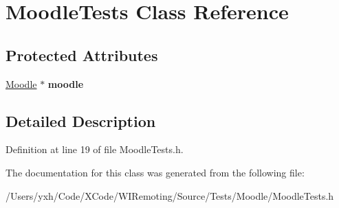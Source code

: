 \hypertarget{interface_moodle_tests}{
\section{MoodleTests Class Reference}
\label{interface_moodle_tests}
}
\subsection*{Protected Attributes}
\begin{DoxyCompactItemize}
\item 
\hypertarget{interface_moodle_tests_a2f2140f7d097167743c3ee5ee0e45f3c}{
\hyperlink{interface_moodle}{Moodle} $\ast$ {\bfseries moodle}}
\label{interface_moodle_tests_a2f2140f7d097167743c3ee5ee0e45f3c}

\end{DoxyCompactItemize}


\subsection{Detailed Description}


Definition at line 19 of file MoodleTests.h.

The documentation for this class was generated from the following file:\begin{DoxyCompactItemize}
\item 
/Users/yxh/Code/XCode/WIRemoting/Source/Tests/Moodle/MoodleTests.h\end{DoxyCompactItemize}
